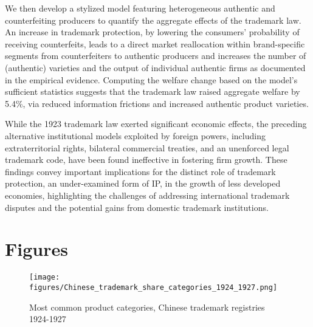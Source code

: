 \documentclass[12pt]{article}
\begin{document}
We then develop a stylized model featuring heterogeneous authentic and counterfeiting producers to quantify the aggregate effects of the trademark law. An increase in trademark protection, by lowering the consumers' probability of receiving counterfeits, leads to a direct market reallocation within brand-specific segments from counterfeiters to authentic producers and increases the number of (authentic) varieties and the output of individual authentic firms as documented in the empirical evidence. Computing the welfare change based on the model's sufficient statistics suggests that the trademark law raised aggregate welfare by 5.4\%, via reduced information frictions and increased authentic product varieties.

While the 1923 trademark law exerted significant economic effects, the preceding alternative institutional models exploited by foreign powers, including extraterritorial rights, bilateral commercial treaties, and an unenforced legal trademark code, have been found ineffective in fostering firm growth. These findings convey important implications for the distinct role of trademark protection, an under-examined form of IP, in the growth of less developed economies, highlighting the challenges of addressing international trademark disputes and the potential gains from domestic trademark institutions.



\clearpage
\appendix
\singlespacing
\setlength{\bibsep}{0.0pt}






\clearpage
\section{Figures}

\begin{figure}[hbt!]

\centering
\texttt{[image: figures/Chinese\_trademark\_share\_categories\_1924\_1927.png]}
\caption{Most common product categories, Chinese trademark registries 1924-1927}
\label{fig:trademarkschina_products}
\end{figure}
\end{document}

